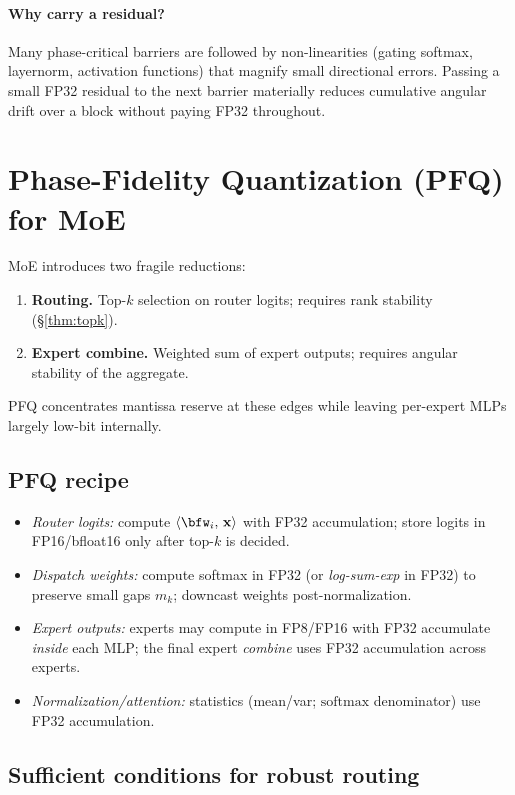 \documentclass[11pt]{article}
\newcommand{\ip}[2]{\left\langle #1,\,#2 \right\rangle}
\newcommand{\bfx}{\mathbf{x}}
\theoremstyle{plain}
\theoremstyle{definition}
\begin{document}
\paragraph{Why carry a residual?}
Many phase-critical barriers are followed by non-linearities (gating softmax, layernorm, activation functions) that magnify small directional errors. Passing a small FP32 residual to the next barrier materially reduces cumulative angular drift over a block without paying FP32 throughout.

\section{Phase-Fidelity Quantization (PFQ) for MoE}
\label{sec:pfq}

MoE introduces two fragile reductions:
\begin{enumerate}
  \item \textbf{Routing.} Top-$k$ selection on router logits; requires rank stability (\S\ref{thm:topk}).
  \item \textbf{Expert combine.} Weighted sum of expert outputs; requires angular stability of the aggregate.
\end{enumerate}
PFQ concentrates mantissa reserve at these edges while leaving per-expert MLPs largely low-bit internally.

\subsection{PFQ recipe}
\begin{itemize}
  \item \emph{Router logits:} compute $\ip{\bfw_i}{\bfx}$ with FP32 accumulation; store logits in FP16/bfloat16 only after top-$k$ is decided.
  \item \emph{Dispatch weights:} compute softmax in FP32 (or \textit{log-sum-exp} in FP32) to preserve small gaps $m_k$; downcast weights post-normalization.
  \item \emph{Expert outputs:} experts may compute in FP8/FP16 with FP32 accumulate \emph{inside} each MLP; the final expert \emph{combine} uses FP32 accumulation across experts.
  \item \emph{Normalization/attention:} statistics (mean/var; $\mathrm{softmax}$ denominator) use FP32 accumulation.
\end{itemize}

\subsection{Sufficient conditions for robust routing}
\end{document}
